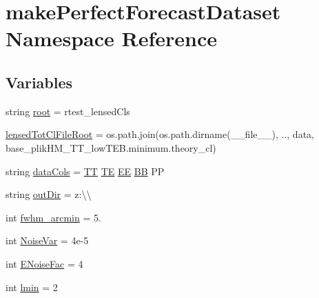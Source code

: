 \hypertarget{namespacemakePerfectForecastDataset}{}\section{make\+Perfect\+Forecast\+Dataset Namespace Reference}
\label{namespacemakePerfectForecastDataset}
\subsection*{Variables}
\begin{DoxyCompactItemize}
\item 
string \mbox{\hyperlink{namespacemakePerfectForecastDataset_af7e5dd18868fb897809f1a029858e619}{root}} = r\textquotesingle{}test\+\_\+lensed\+Cls\textquotesingle{}
\item 
\mbox{\hyperlink{namespacemakePerfectForecastDataset_a0e94e6b4c595055dc953b6d90344b2cf}{lensed\+Tot\+Cl\+File\+Root}} = os.\+path.\+join(os.\+path.\+dirname(\+\_\+\+\_\+file\+\_\+\+\_\+), \textquotesingle{}..\textquotesingle{}, \textquotesingle{}data\textquotesingle{}, \textquotesingle{}base\+\_\+plik\+H\+M\+\_\+\+T\+T\+\_\+low\+T\+E\+B.\+minimum.\+theory\+\_\+cl\textquotesingle{})
\item 
string \mbox{\hyperlink{namespacemakePerfectForecastDataset_a4df4d007ae9b28d5c7144ba797fe589e}{data\+Cols}} = \textquotesingle{}\mbox{\hyperlink{plotTT_8m_a2f803268a6367d0943978eb5f84cc62e}{TT}} \mbox{\hyperlink{plotdiffs_8m_a1a5b2ac8f21dd2ac3d0605ff0b067ec4}{TE}} \mbox{\hyperlink{plotdiffs_8m_a6f96ba8525cc2f838c7d8b6888a1481b}{EE}} \mbox{\hyperlink{plotdiffs_8m_afe7a8c41b6fecba77f519a64a8ac08dc}{BB}} PP\textquotesingle{}
\item 
string \mbox{\hyperlink{namespacemakePerfectForecastDataset_af7ebda3a1c64cc6cec0a262a523b811f}{out\+Dir}} = \textquotesingle{}z\+:\textbackslash{}\textbackslash{}\textquotesingle{}
\item 
int \mbox{\hyperlink{namespacemakePerfectForecastDataset_adf5c2024ddb72d322a72ff26899cccca}{fwhm\+\_\+arcmin}} = 5.
\item 
int \mbox{\hyperlink{namespacemakePerfectForecastDataset_a1787b5246cb8a0c46d008fe173eef0b6}{Noise\+Var}} = 4e-\/5
\item 
int \mbox{\hyperlink{namespacemakePerfectForecastDataset_a1136b171b178b11766a18559601b658c}{E\+Noise\+Fac}} = 4
\item 
int \mbox{\hyperlink{namespacemakePerfectForecastDataset_a3294d7587f3aed55ad5d5b7231ac1127}{lmin}} = 2

\end{DoxyCompactItemize}
